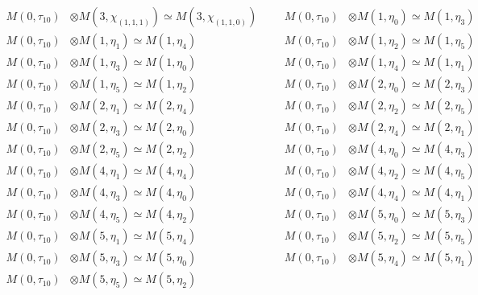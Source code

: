 \begin{align*}
M(0,\tau_{10}) &\otimes M(3,\chi_{(1,1,1)}) \simeq M(3,\chi_{(1,1,0)}) &&& M(0,\tau_{10}) &\otimes M(1,\eta_{0}) \simeq M(1,\eta_{3})\\
M(0,\tau_{10}) &\otimes M(1,\eta_{1}) \simeq M(1,\eta_{4}) &&& M(0,\tau_{10}) &\otimes M(1,\eta_{2}) \simeq M(1,\eta_{5})\\
M(0,\tau_{10}) &\otimes M(1,\eta_{3}) \simeq M(1,\eta_{0}) &&& M(0,\tau_{10}) &\otimes M(1,\eta_{4}) \simeq M(1,\eta_{1})\\
M(0,\tau_{10}) &\otimes M(1,\eta_{5}) \simeq M(1,\eta_{2}) &&& M(0,\tau_{10}) &\otimes M(2,\eta_{0}) \simeq M(2,\eta_{3})\\
M(0,\tau_{10}) &\otimes M(2,\eta_{1}) \simeq M(2,\eta_{4}) &&& M(0,\tau_{10}) &\otimes M(2,\eta_{2}) \simeq M(2,\eta_{5})\\
M(0,\tau_{10}) &\otimes M(2,\eta_{3}) \simeq M(2,\eta_{0}) &&& M(0,\tau_{10}) &\otimes M(2,\eta_{4}) \simeq M(2,\eta_{1})\\
M(0,\tau_{10}) &\otimes M(2,\eta_{5}) \simeq M(2,\eta_{2}) &&& M(0,\tau_{10}) &\otimes M(4,\eta_{0}) \simeq M(4,\eta_{3})\\
M(0,\tau_{10}) &\otimes M(4,\eta_{1}) \simeq M(4,\eta_{4}) &&& M(0,\tau_{10}) &\otimes M(4,\eta_{2}) \simeq M(4,\eta_{5})\\
M(0,\tau_{10}) &\otimes M(4,\eta_{3}) \simeq M(4,\eta_{0}) &&& M(0,\tau_{10}) &\otimes M(4,\eta_{4}) \simeq M(4,\eta_{1})\\
M(0,\tau_{10}) &\otimes M(4,\eta_{5}) \simeq M(4,\eta_{2}) &&& M(0,\tau_{10}) &\otimes M(5,\eta_{0}) \simeq M(5,\eta_{3})\\
M(0,\tau_{10}) &\otimes M(5,\eta_{1}) \simeq M(5,\eta_{4}) &&& M(0,\tau_{10}) &\otimes M(5,\eta_{2}) \simeq M(5,\eta_{5})\\
M(0,\tau_{10}) &\otimes M(5,\eta_{3}) \simeq M(5,\eta_{0}) &&& M(0,\tau_{10}) &\otimes M(5,\eta_{4}) \simeq M(5,\eta_{1})\\
M(0,\tau_{10}) &\otimes M(5,\eta_{5}) \simeq M(5,\eta_{2})
\end{align*}

